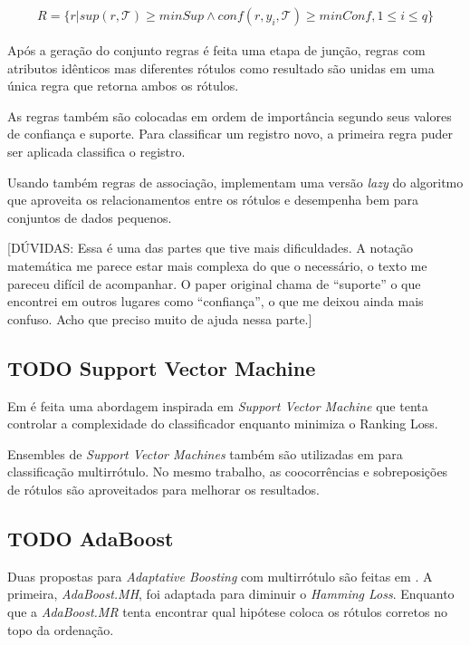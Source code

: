 \documentclass[runningheads,a4paper]{llncs}
\begin{document}
\begin{align*}
	R = \{ r | sup(r, \mathcal{T}) \geq minSup \wedge conf(r, y_i, \mathcal{T}) \geq minConf, 1 \leq i \leq q \}
\end{align*}

Após a geração do conjunto regras é feita uma etapa de junção, regras com atributos idênticos mas diferentes rótulos como resultado são unidas em uma única regra que retorna ambos os rótulos.

As regras também são colocadas em ordem de importância segundo seus valores de confiança e suporte. Para classificar um registro novo, a primeira regra puder ser aplicada classifica o registro.

Usando também regras de associação, \cite{Veloso2007-el} implementam uma versão \textit{lazy} do algoritmo que aproveita os relacionamentos entre os rótulos e desempenha bem para conjuntos de dados pequenos.

[DÚVIDAS: Essa é uma das partes que tive mais dificuldades. A notação matemática me parece estar mais complexa do que o necessário, o texto me pareceu difícil de acompanhar. O paper original chama de \enquote{suporte} o que encontrei em outros lugares como \enquote{confiança}, o que me deixou ainda mais confuso. Acho que preciso muito de ajuda nessa parte.]

\subsection{TODO Support Vector Machine}

Em \cite{Elisseeff2001-lp} é feita uma abordagem inspirada em \textit{Support Vector Machine} que tenta controlar a complexidade do classificador enquanto minimiza o Ranking Loss.

Ensembles de \textit{Support Vector Machines} também são utilizadas em \cite{Godbole2004-su} para classificação multirrótulo. No mesmo trabalho, as coocorrências e sobreposições de rótulos são aproveitados para melhorar os resultados.



\subsection{TODO AdaBoost}
Duas propostas para \textit{Adaptative Boosting} com multirrótulo são feitas em \cite{Schapire2000-yt}. A primeira, \textit{AdaBoost.MH}, foi adaptada para diminuir o \textit{Hamming Loss}. Enquanto que a \textit{AdaBoost.MR} tenta encontrar qual hipótese coloca os rótulos corretos no topo da ordenação.
\end{document}
